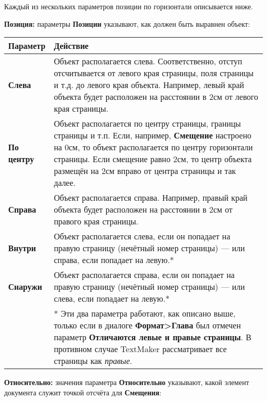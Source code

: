 \documentclass[a4paper,10pt]{article}
\begin{document}
Каждый из нескольких параметров позиции по горизонтали описывается ниже.

\textbf{Позиция:} параметры \textbf{Позиции} указывают, как должен быть выравнен объект:

\begin{center}
\begin{tabular}{  m{4cm}  m{12cm}  }
 \textbf{Параметр} & \textbf{Действие}\\ 
 \hline
  \textbf{Слева} & Объект располагается слева. Соответственно, отступ отсчитывается от левого края страницы, поля страницы и т.д. до левого края объекта. Например, левый край объекта будет расположен на расстоянии в 2см от левого края страницы.\\
  \textbf{По центру} & Объект располагается по центру страницы, границы страницы и т.п. Если, например, \textbf{Смещение} настроено на 0см, то объект располагается по центру горизонтали страницы. Если смещение равно 2см, то центр объекта размещён на 2см вправо от центра страницы и так далее.\\ 
\textbf{Справа} & Объект располагается справа. Например, правый край объекта будет расположен на расстоянии в 2см от правого края страницы.\\
\textbf{Внутри} & Объект располагается слева, если он попадает на правую страницу (нечётный номер страницы) --- или справа, если попадает на левую.*\\
\textbf{Снаружи} & Объект располагается справа, если он попадает на правую страницу (нечётный номер страницы) --- или слева, если попадает на левую.*\\
 & * Эти два параметра работают, как описано выше, только если в диалоге \textbf{Формат>Глава} был отмечен параметр \textbf{Отличаются левые и правые страницы}. В противном случае TextMaker рассматривает все страницы как \textit{правые}.
\end{tabular}
\end{center}

\textbf{Относительно:} значения параметра \textbf{Относительно} указывают, какой элемент документа служит точкой отсчёта для \textbf{Смещения}:
\end{document}
